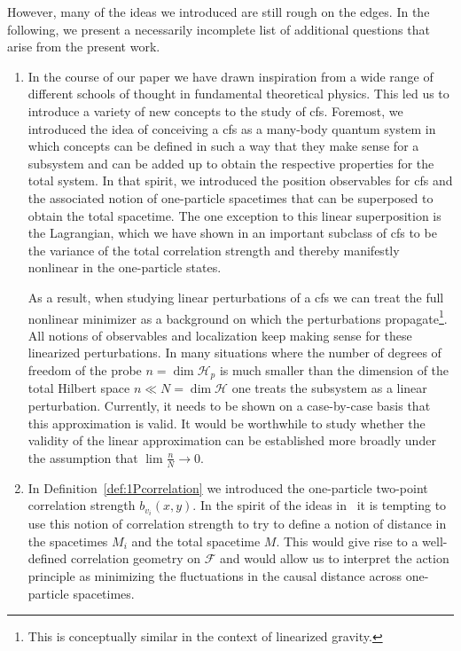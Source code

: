 \documentclass[reqno,11pt]{amsart}
\renewcommand{\H}{\mathcal{H}}
\newcommand{\F}{{\mathcal{F}}}
\numberwithin{equation}{section}
\begin{document}
However, many of the ideas we introduced are still rough on the edges. In the following, we present a necessarily incomplete list of additional questions that arise from the present work.
\begin{enumerate}
      \item In the course of our paper we have drawn inspiration from a wide range of different schools of thought in fundamental theoretical physics. This led us to introduce a variety of new concepts to the study of \ac{cfs}. Foremost, we introduced the idea of conceiving a \ac{cfs} as a many-body quantum system in which concepts can be defined in such a way that they make sense for a subsystem and can be added up to obtain the respective properties for the total system. In that spirit, we introduced the position observables for \ac{cfs} and the associated notion of one-particle spacetimes that can be superposed to obtain the total spacetime. The one exception to this linear superposition is the Lagrangian, which we have shown in an important subclass of \ac{cfs} to be the variance of the total correlation strength and thereby manifestly nonlinear in the one-particle states. 

    As a result, when studying linear perturbations of a \ac{cfs} we can treat the full nonlinear minimizer as a background on which the perturbations propagate\footnote{This is conceptually similar in the context of linearized gravity.}. All notions of observables and localization keep making sense for these linearized perturbations. In many situations where the number of degrees of freedom of the probe $n=\dim \H_p$ is much smaller than the dimension of the total Hilbert space $n \ll N= \dim \H$ one treats the subsystem as a linear perturbation. Currently, it needs to be shown on a case-by-case basis that this approximation is valid. It would be worthwhile to study whether the validity of the linear approximation can be established more broadly under the assumption that $\lim \frac{n}{N}\rightarrow 0$. 
    
    \item In Definition~\ref{def:1Pcorrelation} we introduced the one-particle two-point correlation strength $b_{v_i}(x,y)$. In the spirit of the ideas in~\cite{kempf2021correlational, reitz2023model} it is tempting to use this notion of correlation strength to try to define a notion of distance in the spacetimes $M_i$ and the total spacetime $M$. This would give rise to a well-defined correlation geometry on $\F$ and would allow us to interpret the action principle as minimizing the fluctuations in the causal distance across one-particle spacetimes.   
    

\end{enumerate}
\end{document}
